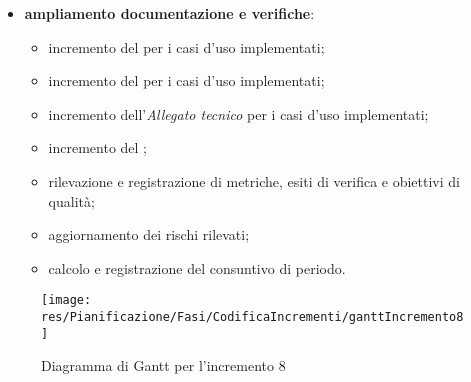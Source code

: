 \begin{itemize}
\item \textbf{ampliamento documentazione e verifiche}:
\begin{itemize}
\item incremento del \textit{\MU{}} per i casi d'uso implementati;
\item incremento del \textit{\MM{}} per i casi d'uso implementati;
\item incremento dell'\textit{Allegato tecnico} per i casi d'uso implementati;
\item incremento del ;
\item rilevazione e registrazione di metriche, esiti di verifica e obiettivi di qualità;
\item aggiornamento dei rischi rilevati;
\item calcolo e registrazione del consuntivo di periodo.
\end{itemize}

\end{itemize}
\begin{figure}[H]
\centering

\centerline{\texttt{[image: res/Pianificazione/Fasi/CodificaIncrementi/ganttIncremento8]}}
\caption{Diagramma di Gantt per l'incremento 8}
\end{figure}